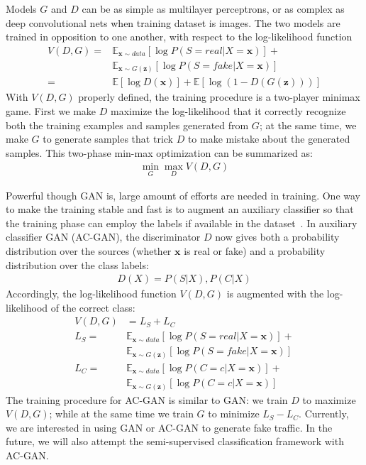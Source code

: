 Models $G$ and $D$ can be as simple as multilayer perceptrons,
or as complex as deep convolutional nets when training dataset is images.
The two models are trained in opposition to one another, with respect to the log-likelihood
function
\begin{equation}
\begin{aligned}
V(D, G) = & \mathbb{E}_{\bm{x}\sim data} [\log P(S=real|X=\bm{x})] + \\
          & \mathbb{E}_{\bm{x}\sim G(\bm{z})} [\log P(S=fake|X=\bm{x})] \\
        = & \mathbb{E}[\log D(\bm{x})] + \mathbb{E}[\log (1 - D(G(\bm{z})))]
\end{aligned}
\end{equation}
With $V(D, G)$ properly defined, the training procedure is a two-player minimax game.
First we make $D$ maximize the log-likelihood that it correctly recognize
both the training examples and samples generated from $G$;
at the same time, we make $G$ to generate samples that trick $D$ to make mistake about the
generated samples.
This two-phase min-max optimization can be summarized as:
\begin{align}
    \min_G \max_D V(D, G)
\end{align}

Powerful though GAN is, large amount of efforts are needed in training.
One way to make the training stable and fast is to augment an auxiliary classifier so that
the training phase can employ the labels if available in the dataset~\cite{AC-GAN}.
In auxiliary classifier GAN (AC-GAN), the discriminator $D$ now gives both a probability
distribution over the sources (whether $\bm{x}$ is real or fake) and a probability distribution
over the class labels:
\begin{align}
    D(X) = P(S|X), P(C|X)
\end{align}
Accordingly, the log-likelihood function $V(D, G)$ is augmented with the log-likelihood of the correct class:
\begin{equation}
\begin{aligned} 
    V(D, G) &= L_S + L_C \\
    L_S = & \mathbb{E}_{\bm{x} \sim data} [\log P(S=real|X=\bm{x})] + \\
          & \mathbb{E}_{\bm{x} \sim G(\bm{z})} [\log P(S=fake|X=\bm{x})] \\
    L_C = & \mathbb{E}_{\bm{x} \sim data}[\log P(C=c|X=\bm{x})] + \\
          & \mathbb{E}_{\bm{x} \sim G(\bm{z})} [\log P(C=c|X=\bm{x})]
\end{aligned}
\end{equation}
The training procedure for AC-GAN is similar to GAN: we train $D$ to maximize $V(D, G)$;
while at the same time we train $G$ to minimize $L_S - L_C$.
Currently, we are interested in using GAN or AC-GAN to generate fake traffic.
In the future, we will also attempt the semi-supervised classification framework with AC-GAN.

